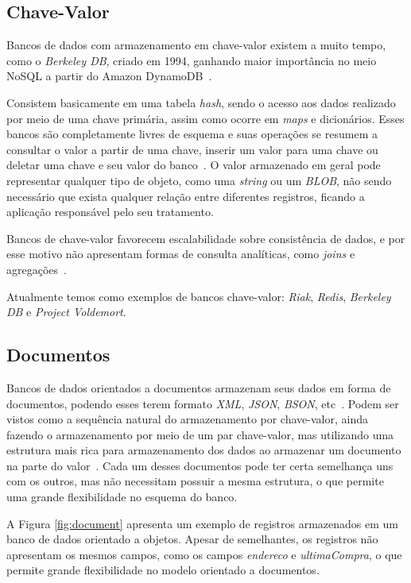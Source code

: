 \subsection*{Chave-Valor}
Bancos de dados com armazenamento em chave-valor existem a muito tempo, como o \emph{Berkeley DB}, criado em 1994, ganhando maior importância no meio NoSQL a partir do Amazon DynamoDB~\cite{chrisnosql}.

Consistem basicamente em uma tabela \emph{hash}, sendo o acesso aos dados realizado por meio de uma chave primária, assim como ocorre em \emph{maps} e dicionários.  Esses bancos são completamente livres de esquema e suas operações se resumem a consultar o valor a partir de uma chave, inserir um valor para uma chave ou deletar uma chave e seu valor do banco~\cite{nosqleval}. O valor armazenado em geral pode representar qualquer tipo de objeto, como uma \emph{string} ou um \emph{BLOB}, não sendo necessário que exista qualquer relação entre diferentes registros, ficando a aplicação responsável pelo seu tratamento. 

Bancos de chave-valor favorecem escalabilidade sobre consistência de dados, e por esse motivo não apresentam formas de consulta analíticas, como \emph{joins} e agregações~\cite{chrisnosql}.

Atualmente temos como exemplos de bancos chave-valor: \emph{Riak}, \emph{Redis}, \emph{Berkeley DB} e \emph{Project Voldemort}.

\subsection*{Documentos}
Bancos de dados orientados a documentos armazenam seus dados em forma de documentos, podendo esses terem formato \emph{XML}, \emph{JSON}, \emph{BSON}, etc~\cite{pramod}. Podem ser vistos como a sequência natural do armazenamento por chave-valor, ainda fazendo o armazenamento por meio de um par chave-valor, mas utilizando uma estrutura mais rica para armazenamento dos dados ao armazenar um documento na parte do valor~\cite{chrisnosql}. Cada um desses documentos pode ter certa semelhança uns com os outros, mas não necessitam possuir a mesma estrutura, o que permite uma grande flexibilidade no esquema do banco.

A Figura \ref{fig:document} apresenta um exemplo de registros armazenados em um banco de dados orientado a objetos. Apesar de semelhantes, os registros não apresentam os mesmos campos, como os campos \emph{endereco} e \emph{ultimaCompra}, o que permite grande flexibilidade no modelo orientado a documentos. 

